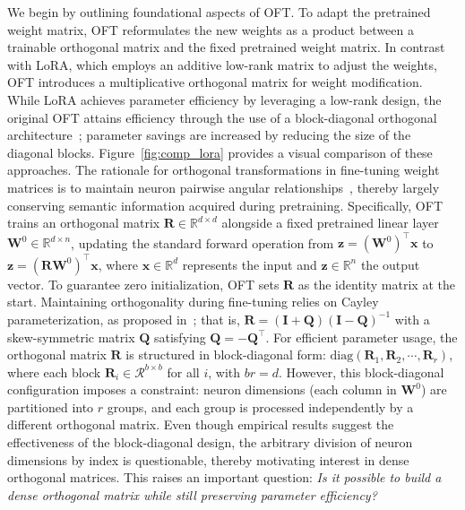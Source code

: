 We begin by outlining foundational aspects of OFT. To adapt the pretrained weight matrix, OFT reformulates the new weights as a product between a trainable orthogonal matrix and the fixed pretrained weight matrix. In contrast with LoRA, which employs an additive low-rank matrix to adjust the weights, OFT introduces a multiplicative orthogonal matrix for weight modification. While LoRA achieves parameter efficiency by leveraging a low-rank design, the original OFT attains efficiency through the use of a block-diagonal orthogonal architecture~\cite{qiu2023controlling}; parameter savings are increased by reducing the size of the diagonal blocks. Figure~\ref{fig:comp_lora} provides a visual comparison of these approaches. The rationale for orthogonal transformations in fine-tuning weight matrices is to maintain neuron pairwise angular relationships~\cite{liu2018learning,liu2021orthogonal,qiu2023controlling}, thereby largely conserving semantic information acquired during pretraining. Specifically, OFT trains an orthogonal matrix $\bm{R}\in\mathbb{R}^{d\times d}$ alongside a fixed pretrained linear layer $\bm{W}^0\in\mathbb{R}^{d\times n}$, updating the standard forward operation from $\bm{z}=(\bm{W}^0)^\top\bm{x}$ to $\bm{z}=(\bm{R}\bm{W}^0)^\top\bm{x}$, where $\bm{x}\in\mathbb{R}^{d}$ represents the input and $\bm{z}\in\mathbb{R}^{n}$ the output vector. To guarantee zero initialization, OFT sets $\bm{R}$ as the identity matrix at the start. Maintaining orthogonality during fine-tuning relies on Cayley parameterization, as proposed in~\cite{qiu2023controlling,liu2021orthogonal}; that is, $\bm{R}=(\bm{I}+\bm{Q})(\bm{I}-\bm{Q})^{-1}$ with a skew-symmetric matrix $\bm{Q}$ satisfying $\bm{Q}=-\bm{Q}^\top$. For efficient parameter usage, the orthogonal matrix $\bm{R}$ is structured in block-diagonal form: $\text{diag}(\bm{R}_1,\bm{R}_2,\cdots,\bm{R}_r)$, where each block $\bm{R}_i\in\mathcal{R}^{b\times b}$ for all $i$, with $br=d$. However, this block-diagonal configuration imposes a constraint: neuron dimensions (each column in $\bm{W}^0$) are partitioned into $r$ groups, and each group is processed independently by a different orthogonal matrix. Even though empirical results suggest the effectiveness of the block-diagonal design, the arbitrary division of neuron dimensions by index is questionable, thereby motivating interest in dense orthogonal matrices. This raises an important question: \emph{Is it possible to build a dense orthogonal matrix while still preserving parameter efficiency?}

